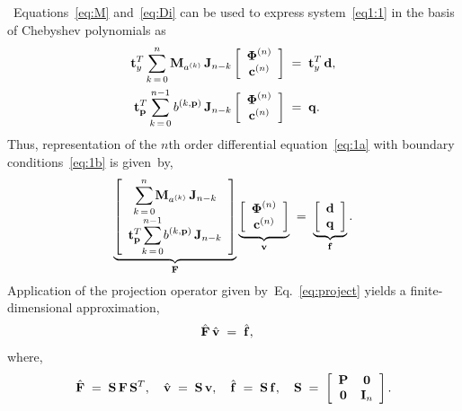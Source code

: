 \documentclass[%
secnumarabic,%
 amssymb, amsmath,%
 aps,prf,superscriptaddress,longbibliography
frontmatterverbose,
]{revtex4-2}
\begin{document}
	\newpage
{}~Equations~\eqref{eq:M}  and~\eqref{eq:Di} can be used to express system~\eqref{eq1:1} in the basis of Chebyshev polynomials as 
\begin{subequations}
\begin{align}
  \mathbf{t}_{y}^T
  \sum_{k \, = \, 0}^{n}
  \mathbf M_{a^{(k)}}
  \,
  \mathbf{J}_{n-k}
  \left[\begin{array}{c}
    \boldsymbol \Phi^{(n)}
    \\ 
    {\mathbf{c}}^{(n)} \end{array}\right] 
    &\;=\; 
    \mathbf{t}_{y}^T\,\mathbf{d},
    \label{eq:nDeq}
	\\[0.cm]
	\label{eq:ndBc}
    \mathbf{t}_{\mathbf{p}}^T\sum_{k \, = \, 0}^{n-1}
    b^{(k,\mathbf p)} 
    \,
    \mathbf{J}_{n-k} 
    \left[\begin{array}{c}
    \boldsymbol \Phi^{(n)}\\
    {\mathbf{c}}^{(n)}
  \end{array}\right]
  &\;=\;
  \mathbf{q}.
  \end{align}
\end{subequations}
Thus, representation of the $n$th order differential equation~\eqref{eq:1a} with boundary conditions~\eqref{eq:1b} is given~by,
\begin{equation}\label{eq:infiniteDim}
  \underbrace{\left[
  \begin{array}{cc}
    \displaystyle{\sum_{k \, = \, 0}^{n}} \mathbf M_{a^{(k)}} \, \mathbf{J}_{n-k}
    \\[0.35cm]
    \mathbf{t}_{\mathbf{p}}^T
    \displaystyle{\sum_{k \, = \, 0}^{n-1}}b^{(k,\mathbf p)} \, \mathbf{J}_{n-k}
  \end{array}\right]}_{\mathbf{F}}\underbrace{\left[\begin{array}{c}
    \boldsymbol \Phi^{(n)}\\
    {\mathbf{c}}^{(n)}
  \end{array}\right]}_{\mathbf{v}} \;=\;\underbrace{\left[\begin{array}{c}
    \mathbf{d}\\
    \mathbf q
  \end{array}\right]}_{\mathbf{f}}.
\end{equation} 
Application of the projection operator given by~Eq.~\eqref{eq:project} yields a finite-dimensional approximation,
\begin{align}\label{eq:nDFinal}
    \hat{\mathbf{F}} \,\hat{\mathbf{v}}\;&=\; \hat{\mathbf{f}},
  \end{align}
 where,
  \begin{equation}\label{eq:Sn}
    \hat{\mathbf{F}} 
    \;=\;  
    \mathbf{S} \,\mathbf{F} \,\mathbf{S}^T, 
    \quad
    \hat{\mathbf{v}} 
    \;=\; 
    \mathbf{S} \, \mathbf{v}, 
    \quad \hat{\mathbf{f}} 
    \;=\; 
    \mathbf{S} \, \mathbf{f}, 
    \quad \mathbf{S} 
    \;=\; 
    \left[\begin{array}{cc}
    \mathbf{P} & \mathbf 0 \\
    \mathbf 0 & \mathbf{I}_n
    \end{array}\right] .
  \end{equation}
\end{document}
